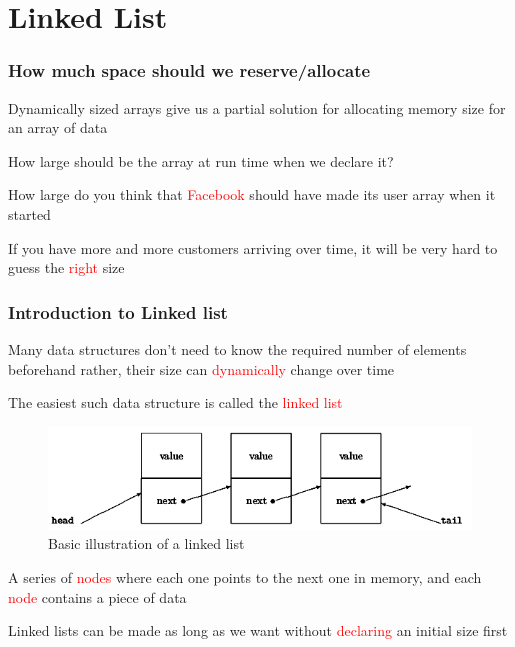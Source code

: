 \documentclass{beamer}
\newcommand{\red}[1]{\textcolor{red}{#1}}
\begin{document}
\section{Linked List}
\begin{frame}
\frametitle{How much space should we reserve/allocate}
Dynamically sized arrays give us a partial solution for
allocating memory size for an array of data

\medskip

How large should be the array at run time when we declare it?

\medskip

How large do you think that \red{Facebook} should have made
its user array when it started

\medskip

If you have more and more customers arriving over time, it will be very hard to guess the \red{right} size


\end{frame}
\begin{frame}
\frametitle{Introduction to Linked list}

Many data structures don’t need to know the required number of elements beforehand rather, their size can \red{dynamically} change over time

\medskip

The easiest such data
structure is called the \red{linked list}

\begin{figure}
\centering
\includegraphics[scale=0.5]{linkedlist.png}
\caption{Basic illustration of a linked list}
\end{figure}

A series of \red{nodes} where each one points to the next one in memory, and
each \red{node} contains a piece of data

\medskip

Linked lists can be made as long as we want without \red{declaring} an initial size first

\end{frame}
\end{document}
